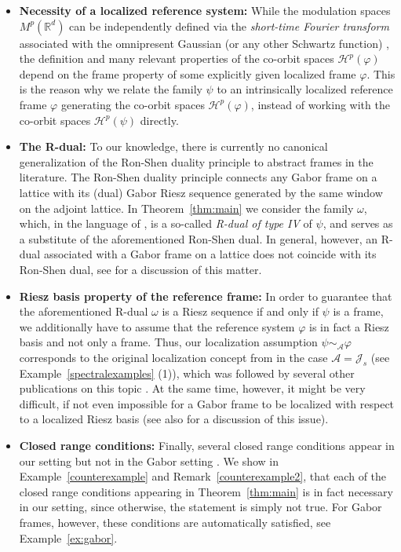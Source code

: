 \documentclass{amsart}
\def\Hil{\mathcal{H}}
\newcommand{\R}[0]{{\mathbb{R}}}
\newcommand{\G}[0]{{\mathcal{G}}}
\newcommand{\A}[0]{{\mathcal{A}}}
\newcommand{\J}[0]{{\mathcal{J}}}
\begin{document}
\begin{itemize}
\item \textbf{Necessity of a localized reference system:} While the modulation spaces $M^p(\R^d)$ can be independently defined via the \emph{short-time Fourier transform} associated with the omnipresent Gaussian (or any other Schwartz function) \cite{gr01}, the definition and many relevant properties of the co-orbit spaces $\Hil^p(\varphi)$ depend on the frame property of some explicitly given localized frame $\varphi$. This is the reason why we relate the family $\psi$ to an intrinsically localized reference frame $\varphi$ generating the co-orbit spaces $\Hil^p(\varphi)$, instead of working with the co-orbit spaces $\Hil^p(\psi)$ directly.
\item \textbf{The R-dual:} To our knowledge, there is currently no canonical generalization of the Ron-Shen duality principle to abstract frames in the literature. %
The Ron-Shen duality principle connects any Gabor frame on a lattice with its (dual) Gabor Riesz sequence generated by the same window on the adjoint lattice. In Theorem~\ref{thm:main} we consider the family $\omega$, which, in the language of \cite{r-duals}, is a so-called \emph{R-dual of type IV} of $\psi$, and serves as a substitute of the aforementioned Ron-Shen dual. In general, however, an R-dual associated with a Gabor frame on a lattice does not coincide with its Ron-Shen dual, see \cite{Casazza2004,r-duals} for a discussion of this matter. 
\item \textbf{Riesz basis property of the reference frame:} In order to guarantee that the aforementioned R-dual $\omega$ is a Riesz sequence if and only if $\psi$ is a frame, we additionally have to assume that the reference system $\varphi$ is in fact a Riesz basis and not only a frame. Thus, our localization assumption $\psi \sim_\A \varphi$ corresponds to the original localization concept from \cite{groe04} in the case $\A = \J_s$ (see Example~\ref{spectralexamples} (1)), which was followed by several other publications on this topic \cite{ALDROUBI20081667,bacahela06a,Balan2006,xxlgro14,forngroech1}. At the same time, however, it might be very difficult, if not even impossible %
for a Gabor frame to be localized with respect to a localized Riesz basis (see also \cite[Section~5]{groe04} for a discussion of this issue). 
\item \textbf{Closed range conditions:} Finally, several closed range conditions appear in our setting but not in the Gabor setting \cite{gro07ineq}. We show in Example~\ref{counterexample} and Remark~\ref{counterexample2}, that each of the closed range conditions appearing in Theorem~\ref{thm:main} is in fact necessary in our setting, since otherwise, the statement is simply not true. For Gabor frames, however, these conditions are automatically satisfied, see Example~\ref{ex:gabor}. 
\end{itemize} 
\end{document}
